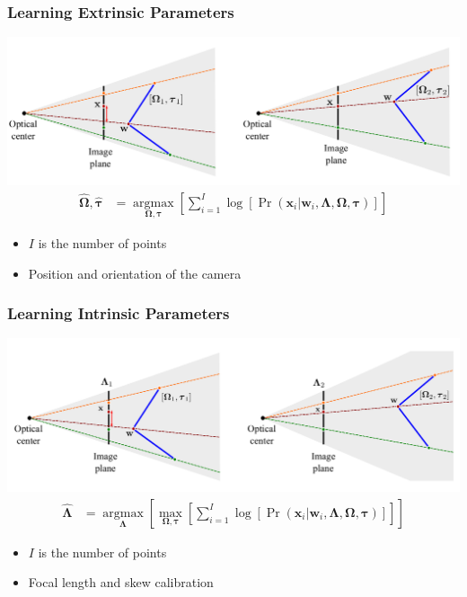 \documentclass{beamer}
\begin{document}
\begin{frame}
  \frametitle{Learning Extrinsic Parameters}
  \includegraphics[width=1.0\textwidth]{fig/recap1.png}
  \begin{align*}
    \boldsymbol{\hat{\Omega}},\bm{\hat{\tau}} &=
    \underset{\boldsymbol{\Omega},\bm{\tau}}
    {\operatorname{argmax}} \left[
      \sum_{i=1}^I \log{\left[
    \Pr(\mathbf{x}_i|\mathbf{w}_i,\boldsymbol{\Lambda},\boldsymbol{\Omega},
    \bm{\tau})
      \right]}
    \right]
  \end{align*}
  \begin{itemize}
    \item<2-> $I$ is the number of points
    \item<3-> Position and orientation of the camera
  \end{itemize}
\end{frame}

\begin{frame}
  \frametitle{Learning Intrinsic Parameters}
  \includegraphics[width=1.0\textwidth]{fig/recap2.png}
  \begin{align*}
    \boldsymbol{\hat{\Lambda}} &=
    \underset{\boldsymbol{\Lambda}}
    {\operatorname{argmax}} \left[
    \underset{\boldsymbol{\Omega},\bm{\tau}}
    {\operatorname{max}} \left[
      \sum_{i=1}^I \log{\left[
    \Pr(\mathbf{x}_i|\mathbf{w}_i,\boldsymbol{\Lambda},\boldsymbol{\Omega},
    \bm{\tau})
      \right]}
  \right]\right]
  \end{align*}
  \begin{itemize}
    \item<2-> $I$ is the number of points
    \item<3-> Focal length and skew calibration
  \end{itemize}
\end{frame}
\end{document}
